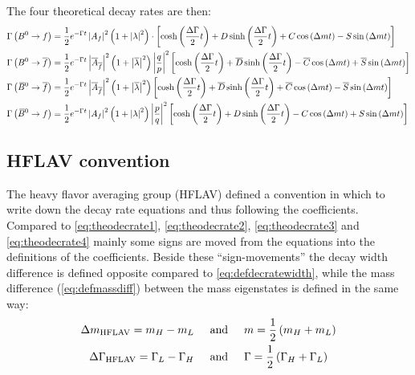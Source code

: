 The four theoretical decay rates are then:
\begin{align}
  \Gamma\left(B^0\rightarrow f\right) &= \frac{1}{2}e^{-\Gamma t}\left| A_f \right|^2 \left(1+\left|\lambda\right|^2\right) \cdot \left[
  \cosh\left(\frac{\Delta\Gamma}{2}t\right)+D\sinh\left(\frac{\Delta\Gamma}{2}t\right)+C\cos\left(\Delta mt\right)
  -S\sin\left(\Delta mt\right)\right] \label{eq:theodecrate1}\\
  \Gamma\left(B^0\rightarrow \overline{f}\right) &= \frac{1}{2}e^{-\Gamma t}\left| \overline{A}_{\overline{f}} \right|^2
  \left(1+\left|\overline{\lambda}\right|^2\right) \left|\frac{q}{p}\right|^2
  \left[\cosh\left(\frac{\Delta\Gamma}{2}t\right)+\overline{D}\sinh\left(\frac{\Delta\Gamma}{2}t\right)
  -\overline{C}\cos\left(\Delta mt\right)+\overline{S}\sin\left(\Delta mt\right)\right]\label{eq:theodecrate2}\\
  \Gamma\left(\kern 0.18em\overline{\kern -0.18em B}{}^0\rightarrow \overline{f}\right) &= \frac{1}{2}e^{-\Gamma t}\left| \overline{A}_{\overline{f}} \right|^2
  \left(1+\left|\overline{\lambda}\right|^2\right)
  \left[\cosh\left(\frac{\Delta\Gamma}{2}t\right)+\overline{D}\sinh\left(\frac{\Delta\Gamma}{2}t\right)
  +\overline{C}\cos\left(\Delta mt\right)-\overline{S}\sin\left(\Delta mt\right)\right]\label{eq:theodecrate3}\\
  \Gamma\left(\kern 0.18em\overline{\kern -0.18em B}{}^0\rightarrow f\right) &= \frac{1}{2}e^{-\Gamma t}\left| A_f \right|^2
  \left(1+\left|\lambda\right|^2\right) \left|\frac{p}{q}\right|^2
  \left[\cosh\left(\frac{\Delta\Gamma}{2}t\right)+D\sinh\left(\frac{\Delta\Gamma}{2}t\right)
  -C\cos\left(\Delta mt\right)+S\sin\left(\Delta mt\right)\right]\label{eq:theodecrate4}
\end{align}

\subsection{HFLAV convention}
\label{sec:HFLAVconv}

The heavy flavor averaging group (HFLAV) defined a convention in which to write down the decay rate equations and thus following
the \CP coefficients. Compared to \cref{eq:theodecrate1}, \cref{eq:theodecrate2}, \cref{eq:theodecrate3} and \cref{eq:theodecrate4}
mainly some signs are moved from the equations into the definitions of the \CP coefficients. Beside these \enquote{sign-movements}
the decay width difference is defined opposite compared to \cref{eq:defdecratewidth}, while the mass difference (\cref{eq:defmassdiff})
between the mass eigenstates is defined in the same way:
\begin{align}
    \Delta m_{\text{HFLAV}} = m_H - m_L \hspace{0.5cm} &\text{and} \hspace{0.5cm} m = \frac{1}{2}\left(m_H+ m_L\right)\\
    \Delta \Gamma_{\text{HFLAV}} = \Gamma_L - \Gamma_H \hspace{0.5cm} &\text{and} \hspace{0.5cm} \Gamma = \frac{1}{2}\left(\Gamma_H + \Gamma_L\right)
\end{align}

